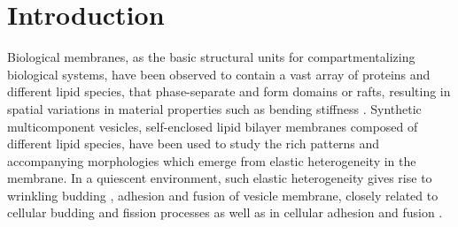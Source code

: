 \documentclass[twoside,twocolumn,9pt]{article}
\begin{document}
\renewcommand*\rmdefault{bch}\normalfont\upshape
\rmfamily
\section*{}
\vspace{-1cm}








\section{\label{sec:Introduction}Introduction}
Biological membranes, as the basic structural units for compartmentalizing biological systems, 
have been observed to contain a vast array of proteins and different lipid species, that phase-separate and form domains or rafts, resulting in spatial variations in material properties such as bending stiffness \cite{}. Synthetic multicomponent vesicles, self-enclosed lipid bilayer membranes composed of different lipid species, have been used to study the rich patterns and accompanying morphologies which emerge from elastic heterogeneity in the membrane.  In a quiescent environment,  such elastic heterogeneity gives rise to wrinkling budding \cite{Lowengrub2009_PRE,Li2012_CommMathSci}, adhesion and fusion \cite{Zhao2011_PRE} of vesicle membrane, closely related to cellular budding and fission processes \cite{Rauch2000_BiophysJ} as well as in cellular adhesion and fusion \cite{Takeda2003_PNAS}. 
\end{document}
